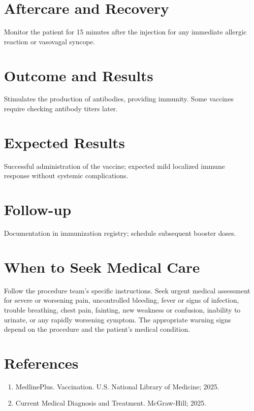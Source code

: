 \section*{Aftercare and Recovery}
Monitor the patient for 15 minutes after the injection for any immediate allergic reaction or vasovagal syncope.

\section*{Outcome and Results}
Stimulates the production of antibodies, providing immunity. Some vaccines require checking antibody titers later.

\section*{Expected Results}
Successful administration of the vaccine; expected mild localized immune response without systemic complications.

\section*{Follow-up}
Documentation in immunization registry; schedule subsequent booster doses.

\section*{When to Seek Medical Care}
Follow the procedure team's specific instructions. Seek urgent medical assessment for severe or worsening pain, uncontrolled bleeding, fever or signs of infection, trouble breathing, chest pain, fainting, new weakness or confusion, inability to urinate, or any rapidly worsening symptom. The appropriate warning signs depend on the procedure and the patient's medical condition.

\section*{References}
\begin{enumerate}
  \item MedlinePlus. Vaccination. U.S. National Library of Medicine; 2025.
  \item Current Medical Diagnosis and Treatment. McGraw-Hill; 2025.
\end{enumerate}

\clearpage
